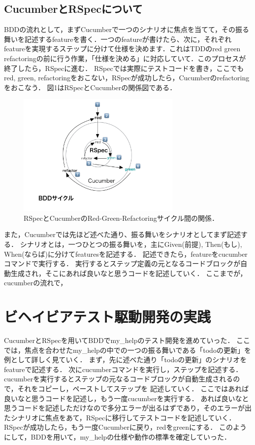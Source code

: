 \documentclass[10pt,a4j,twocolumn]{jsarticle}
\begin{document}
\subsection{CucumberとRSpecについて}
BDDの流れとして，まずCucumberで一つのシナリオに焦点を当てて，その振る舞いを記述するfeatureを書く．一つのfeatureが書けたら、次に，それぞれfeatureを実現するステップに分けて仕様を決めます．これはTDDのred green refactoringの前に行う作業，「仕様を決める」に対応していて．このプロセスが終了したら，RSpecに進む．
RSpecでは実際にテストコードを書き，ここでもred, green, refactoringをおこない，RSpecが成功したら，Cucumberのrefactoringをおこなう．
図1はRSpecとCucumberの関係図である．
\begin{figure}
\begin{center}
\includegraphics[width=8cm, bb=0 0 737 553]{my_help_nasu.001.png}
\caption{RSpecとCucumberのRed-Green-Refactoringサイクル間の関係．}
\end{center}
\vspace{0\baselineskip}
\end{figure}

また，Cucumberでは先ほど述べた通り、振る舞いをシナリオとしてまず記述する．
シナリオとは，一つひとつの振る舞いを，主にGiven(前提), Then(もし), When(ならば)に分けてfeaturesを記述する．
記述できたら，featureをcucumberコマンドで実行する．
実行するとステップ定義の元となるコードブロックが自動生成され，そこにあれば良いなと思うコードを記述していく．
ここまでが，cucumberの流れで，

\section{ビヘイビアテスト駆動開発の実践}
CucumberとRSpecを用いてBDDでmy\_helpのテスト開発を進めていった．
ここでは，焦点を合わせたmy\_helpの中での一つの振る舞いである「todoの更新」を例として詳しく見ていく．
まず，先に述べた通り「todoの更新」のシナリオをfeatureで記述する．
次にcucumberコマンドを実行し，ステップを記述する．
cucumberを実行するとステップの元なるコードブロックが自動生成されるので，それをコピーし，ペーストしてステップを
記述していく．
ここではあれば良いなと思うコードを記述し，もう一度cucumberを実行する．
あれば良いなと思うコードを記述しただけなので多分エラーが出るはずであり，そのエラーが出たシナリオに焦点をあて，RSpecに移行してテストコードを記述していく．
RSpecが成功したら，もう一度Cucumberに戻り，redをgreenにする．
このようにして，BDDを用いて，my\_helpの仕様や動作の標準を確定していった．
\end{document}
